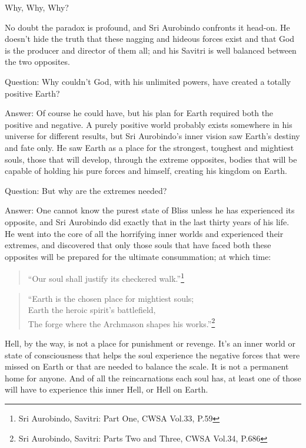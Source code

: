 \documentclass[12pt,a4paper]{book}
\begin{document}
\noindent Why, Why, Why?

No doubt the paradox is profound, and Sri Aurobindo confronts it
head-on. He doesn't hide the truth that these nagging and hideous
forces exist and that God is the producer and director of them all;
and his Savitri is well balanced between the two opposites.

Question: Why couldn't God, with his unlimited powers, have created a
totally positive Earth?

Answer: Of course he could have, but his plan for Earth required both
the positive and negative. A purely positive world probably exists
somewhere in his universe for different results, but Sri Aurobindo's
inner vision saw Earth's destiny and fate only. He saw Earth as a
place for the strongest, toughest and mightiest souls, those that will
develop, through the extreme opposites, bodies that will be capable of
holding his pure forces and himself, creating his kingdom on Earth.

Question: But why are the extremes needed?

Answer: One cannot know the purest state of Bliss unless he has
experienced its opposite, and Sri Aurobindo did exactly that in the
last thirty years of his life. He went into the core of all the
horrifying inner worlds and experienced their extremes, and discovered
that only those souls that have faced both these opposites will be
prepared for the ultimate consummation; at which time:

\begin{verse}
``Our soul shall justify its checkered walk.''\footnote{Sri Aurobindo, Savitri: Part One, CWSA Vol.33, P.59}
\end{verse}

\begin{verse}
``Earth is the chosen place for mightiest souls;\\ Earth the heroic
  spirit's battlefield,\\ The forge where the Archmason shapes his
  works.''\footnote{Sri Aurobindo, Savitri: Parts Two and Three, CWSA
    Vol.34, P.686}
\end{verse}

Hell, by the way, is not a place for punishment or revenge. It's an
inner world or state of consciousness that helps the soul experience
the negative forces that were missed on Earth or that are needed to
balance the scale. It is not a permanent home for anyone. And of all
the reincarnations each soul has, at least one of those will have to
experience this inner Hell, or Hell on Earth.
\end{document}
